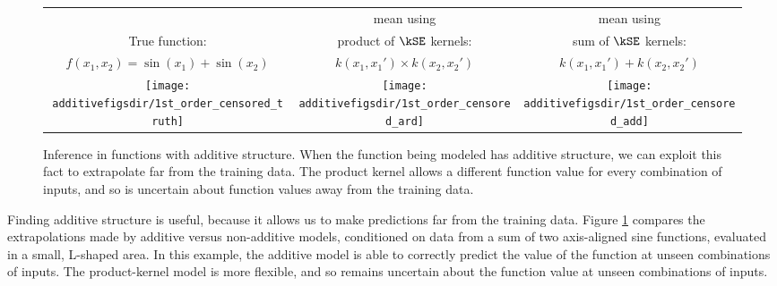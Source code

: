 \begin{figure}
\centering
\begin{tabular}{ccc}
 & \gp{} mean using & \gp{} mean using \\
True function: & product of $\kSE$ kernels: & sum of $\kSE$ kernels: \\
\parbox{0.33\columnwidth}{$f(x_1, x_2) = \sin(x_1) + \sin(x_2)$} & $k(x_1, x_1') \times k(x_2, x_2')$ & $k(x_1, x_1') + k(x_2, x_2')$ \\[0.2em]
\hspace{-0.1in}\texttt{[image: \\additivefigsdir/1st\_order\_censored\_truth]} &
\hspace{-0.1in}\texttt{[image: \\additivefigsdir/1st\_order\_censored\_ard]}&
\hspace{-0.1in}\texttt{[image: \\additivefigsdir/1st\_order\_censored\_add]} \\[1em]
\end{tabular}
\caption[Long-range inference in functions with additive structure]
{Inference in functions with additive structure.
When the function being modeled has additive structure, we can exploit this fact to extrapolate far from the training data.
The product kernel allows a different function value for every combination of inputs, and so is uncertain about function values away from the training data.
}
\label{fig:synth2d}
\end{figure}

Finding additive structure is useful, because it allows us to make predictions far from the training data.
Figure \ref{fig:synth2d} compares the extrapolations made by additive versus non-additive \gp{} models, conditioned on data from a sum of two axis-aligned sine functions, evaluated in a small, L-shaped area.
In this example, the additive model is able to correctly predict the value of the function at unseen combinations of inputs.
The product-kernel model is more flexible, and so remains uncertain about the function value at unseen combinations of inputs.

